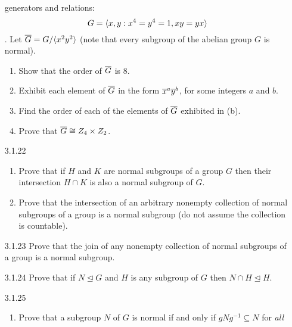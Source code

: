\begin{enumerate}
                  generators and relations:
                  $$G = \langle x, y : x^4 = y^4 = 1, xy = yx \rangle$$.
                  Let $\overline{G} = G/\langle x^2y^2 \rangle$ (note that every subgroup of the
                  abelian group $G$ is normal).
                  \begin{enumerate}
                     \item Show that the order of $\overline{G}$ is 8.
                     \item Exhibit each element of $\overline{G}$ in the form
                           $\overline{x}^a\overline{y}^b$, for some integers $a$ and $b$.
                     \item Find the order of each of the elements of $\overline{G}$
                           exhibited in (b).
                     \item Prove that $\overline{G} \cong Z_4 \times Z_2$.
                  \end{enumerate}
   \item[3.1.22]  \begin{enumerate}
                     \item Prove that if $H$ and $K$ are normal subgroups of a
                           group $G$ then their intersection $H \cap K$ is also
                           a normal subgroup of $G$.
                     \item Prove that the intersection of an arbitrary nonempty
                           collection of normal subgroups of a group is a normal
                           subgroup (do not assume the collection is countable).
                  \end{enumerate}
   \item[3.1.23]  Prove that the join of any nonempty collection of normal
                  subgroups of a group is a normal subgroup.
   \item[3.1.24]  Prove that if $N \trianglelefteq G$ and $H$ is any subgroup of
                  $G$ then $N \cap H \trianglelefteq H$.
   \item[3.1.25]  \begin{enumerate}
                     \item Prove that a subgroup $N$ of $G$ is normal if and
                           only if $gNg^{-1} \subseteq N$ for \textit{all}

\end{enumerate}
\end{enumerate}
